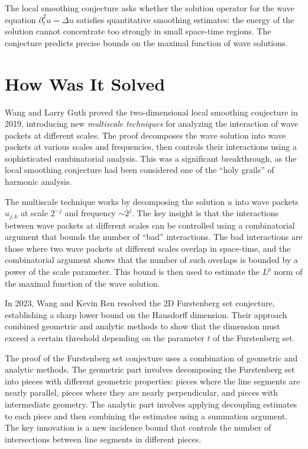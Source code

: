 The local smoothing conjecture asks whether the solution operator for the wave equation $\partial_t^2 u = \Delta u$ satisfies quantitative smoothing estimates: the energy of the solution cannot concentrate too strongly in small space-time regions. The conjecture predicts precise bounds on the maximal function of wave solutions.

\section{How Was It Solved}

Wang and Larry Guth proved the two-dimensional local smoothing conjecture in 2019, introducing new \emph{multiscale techniques} for analyzing the interaction of wave packets at different scales. The proof decomposes the wave solution into wave packets at various scales and frequencies, then controls their interactions using a sophisticated combinatorial analysis. This was a significant breakthrough, as the local smoothing conjecture had been considered one of the ``holy grails'' of harmonic analysis.

The multiscale technique works by decomposing the solution $u$ into wave packets $u_{j,k}$ at scale $2^{-j}$ and frequency $\sim 2^j$. The key insight is that the interactions between wave packets at different scales can be controlled using a combinatorial argument that bounds the number of ``bad'' interactions. The bad interactions are those where two wave packets at different scales overlap in space-time, and the combinatorial argument shows that the number of such overlaps is bounded by a power of the scale parameter. This bound is then used to estimate the $L^p$ norm of the maximal function of the wave solution.

In 2023, Wang and Kevin Ren resolved the 2D Furstenberg set conjecture, establishing a sharp lower bound on the Hausdorff dimension. Their approach combined geometric and analytic methods to show that the dimension must exceed a certain threshold depending on the parameter $t$ of the Furstenberg set.

The proof of the Furstenberg set conjecture uses a combination of geometric and analytic methods. The geometric part involves decomposing the Furstenberg set into pieces with different geometric properties: pieces where the line segments are nearly parallel, pieces where they are nearly perpendicular, and pieces with intermediate geometry. The analytic part involves applying decoupling estimates to each piece and then combining the estimates using a summation argument. The key innovation is a new incidence bound that controls the number of intersections between line segments in different pieces.

